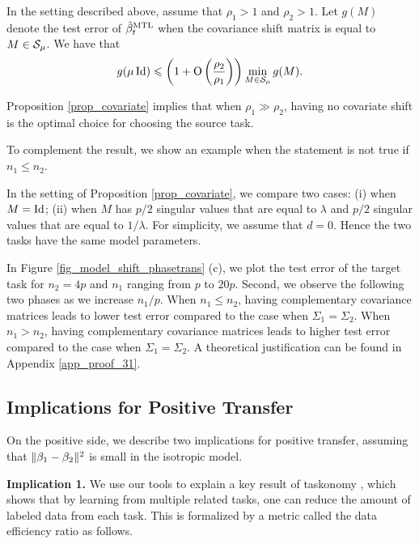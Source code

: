 \begin{proposition}\label{prop_covariate}
	In the setting described above, assume that $\rho_1 > 1$ and $\rho_2>1$.
	Let $g(M)$ denote the test error of $\hat{\beta}_t^{\text{MTL}}$ when the covariance shift matrix is equal to $M\in\mathcal{S}_{\mu}$.
	We have that \[ g(\mu\operatorname{Id}) \leqslant \left({1+ \operatorname{O}\left(\frac{\rho_2}{\rho_1}  \right)}\right) \min_{M\in\mathcal{S}_{\mu}} g(M). \]
\end{proposition}
Proposition \ref{prop_covariate} implies that when $\rho_1\gg \rho_2$, having no covariate shift is the optimal choice for choosing the source task.

\todo{} To complement the result, we show an example when the statement is not true if $n_1 \le n_2$.
\begin{example}\label{ex_complement}
	In the setting of Proposition \ref{prop_covariate}, we compare two cases: (i) when $M = \operatorname{Id}$; (ii) when $M$ has $p/2$ singular values that are equal to $\lambda$ and $p/2$ singular values that are equal to $1 / \lambda$.
	For simplicity, we assume that $d = 0$.
	Hence the two tasks have the same model parameters.

	In Figure \ref{fig_model_shift_phasetrans} (c), we plot the test error of the target task for $n_2 = 4p$ and $n_1$ ranging from $p$ to $20p$.
	Second, we observe the following two phases as we increase $n_1 / p$.
	When $n_1 \le n_2$, having complementary covariance matrices leads to lower test error compared to the case when $\Sigma_1 = \Sigma_2$.
	When $n_1 > n_2$, having complementary covariance matrices leads to higher test error compared to the case when $\Sigma_1 = \Sigma_2$.
	A theoretical justification can be found in Appendix \ref{app_proof_31}.
\end{example}


\subsection{Implications for Positive Transfer}\label{sec_benefit}

On the positive side, we describe two implications for positive transfer, assuming that $\|\beta_1 - \beta_2\|^2$ is small in the isotropic model.

\textbf{Implication 1.}
We use our tools to explain a key result of taskonomy \cite{ZSSGM18}, which shows that by learning from multiple related tasks, one can reduce the amount of labeled data from each task.
This is formalized by a metric called the data efficiency ratio as follows.

